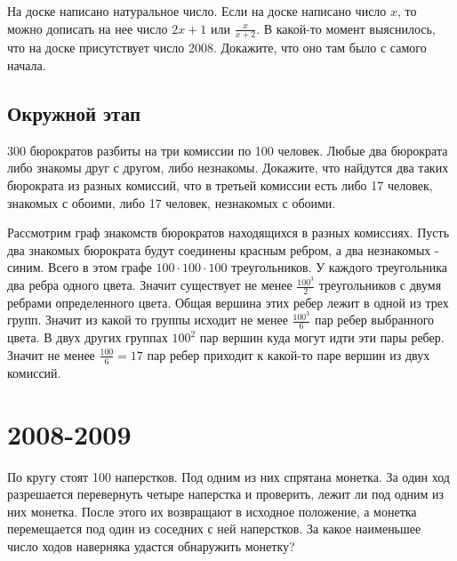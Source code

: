 \documentclass[11pt, a4paper]{common/document_template}
\begin{document}
\begin{exercise}
На доске написано натуральное число. Если на доске написано число $x$, то можно дописать на нее число $2x + 1$ или $\frac{x}{x + 2}$. В какой-то момент выяснилось, что на доске присутствует число 2008. Докажите, что оно там было с самого начала.
\end{exercise}

\section{Окружной этап}

\begin{exercise}
300 бюрократов разбиты на три комиссии по 100 человек. Любые два бюрократа либо знакомы друг с другом, либо незнакомы. Докажите, что найдутся два таких бюрократа из разных комиссий, что в третьей комиссии есть либо 17 человек, знакомых с обоими, либо 17 человек, незнакомых с обоими.
\end{exercise}

\begin{Solution}
Рассмотрим граф знакомств бюрократов находящихся в разных комиссиях. Пусть два знакомых бюрократа будут соединены красным ребром, а два незнакомых - синим. Всего в этом графе $100 \cdot 100 \cdot 100$ треугольников. У каждого треугольника два ребра одного цвета. Значит существует не менее $\frac{100^{3}}{2}$ треугольников с двумя ребрами определенного цвета. Общая вершина этих ребер лежит в одной из трех групп. Значит из какой то группы исходит не менее $\frac{100^{3}}{6}$ пар ребер выбранного цвета. В двух других группах $100^{2}$ пар вершин куда могут идти эти пары ребер. Значит не менее $\frac{100}{6} = 17$ пар ребер приходит к какой-то паре вершин из двух комиссий.
\end{Solution}

\chapter{2008-2009}

\begin{exercise}
По кругу стоят 100 наперстков. Под одним из них спрятана монетка. За один ход разрешается перевернуть четыре наперстка и проверить, лежит ли под одним из них монетка. После этого их возвращают в исходное положение, а монетка перемещается под один из соседних с ней наперстков. За какое наименьшее число ходов наверняка удастся обнаружить монетку?
\end{exercise}
\end{document}

